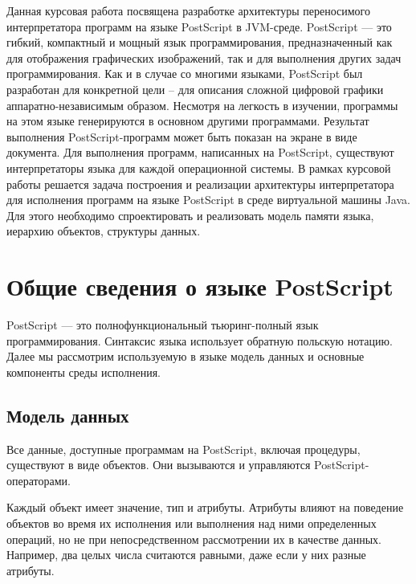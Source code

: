 \documentclass[14pt]{extarticle}
\begin{document}
Данная курсовая работа посвящена разработке архитектуры переносимого интерпретатора программ на языке PostScript \cite{plrm} в JVM-среде. PostScript —  это гибкий,  компактный и мощный язык	программирования, предназначенный как для отображения графических изображений, так и для выполнения других задач программирования. Как и в случае со многими языками, PostScript был разработан для конкретной цели – для описания сложной цифровой графики аппаратно-независимым образом. Несмотря на легкость в изучении, программы на этом языке генерируются в основном другими программами. Результат выполнения PostScript-программ может быть показан на экране в виде документа. Для выполнения программ, написанных на PostScript, существуют интерпретаторы языка для каждой  операционной системы.
В рамках курсовой работы решается задача построения и реализации архитектуры интерпретатора для исполнения программ на языке PostScript в среде виртуальной машины Java. Для этого необходимо спроектировать и реализовать модель памяти языка, иерархию объектов, структуры данных.

\pagebreak
\section{Общие сведения о языке PostScript}
PostScript --- это полнофункциональный тьюринг-полный язык программирования. Синтаксис языка использует обратную польскую нотацию. Далее мы рассмотрим используемую в языке модель данных и основные компоненты среды исполнения.

\subsection{Модель данных}
Все данные, доступные программам на PostScript, включая процедуры, существуют в виде объектов. Они вызываются и управляются  PostScript-операторами. 

Каждый объект имеет значение, тип и атрибуты. Атрибуты влияют на поведение объектов во время их исполнения или выполнения над ними определенных операций, но не при непосредственном рассмотрении их в качестве данных. Например, два целых числа считаются равными, даже если у них разные атрибуты.
\end{document}
